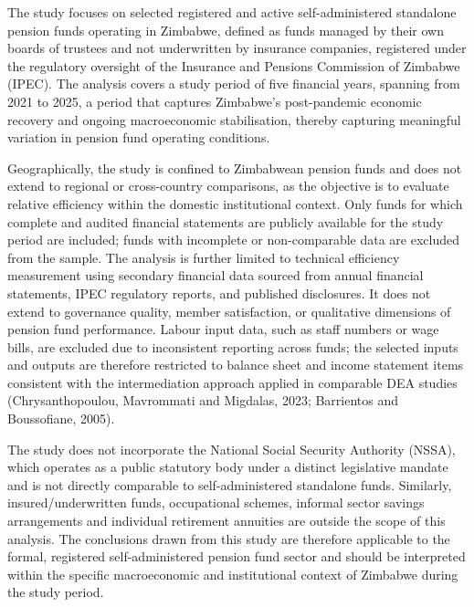 \documentclass[12pt,a4paper]{article}
\begin{document}
The study focuses on selected registered and active self-administered standalone pension funds operating in Zimbabwe, defined as funds managed by their own boards of trustees and not underwritten by insurance companies, registered under the regulatory oversight of the Insurance and Pensions Commission of Zimbabwe (IPEC). The analysis covers a study period of five financial years, spanning from 2021 to 2025, a period that captures Zimbabwe's post-pandemic economic recovery and ongoing macroeconomic stabilisation, thereby capturing meaningful variation in pension fund operating conditions.

Geographically, the study is confined to Zimbabwean pension funds and does not extend to regional or cross-country comparisons, as the objective is to evaluate relative efficiency within the domestic institutional context. Only funds for which complete and audited financial statements are publicly available for the study period are included; funds with incomplete or non-comparable data are excluded from the sample. The analysis is further limited to technical efficiency measurement using secondary financial data sourced from annual financial statements, IPEC regulatory reports, and published disclosures. It does not extend to governance quality, member satisfaction, or qualitative dimensions of pension fund performance. Labour input data, such as staff numbers or wage bills, are excluded due to inconsistent reporting across funds; the selected inputs and outputs are therefore restricted to balance sheet and income statement items consistent with the intermediation approach applied in comparable DEA studies (Chrysanthopoulou, Mavrommati and Migdalas, 2023; Barrientos and Boussofiane, 2005).

The study does not incorporate the National Social Security Authority (NSSA), which operates as a public statutory body under a distinct legislative mandate and is not directly comparable to self-administered standalone funds. Similarly, insured/underwritten funds, occupational schemes, informal sector savings arrangements and individual retirement annuities are outside the scope of this analysis. The conclusions drawn from this study are therefore applicable to the formal, registered self-administered pension fund sector and should be interpreted within the specific macroeconomic and institutional context of Zimbabwe during the study period.

\end{document}
